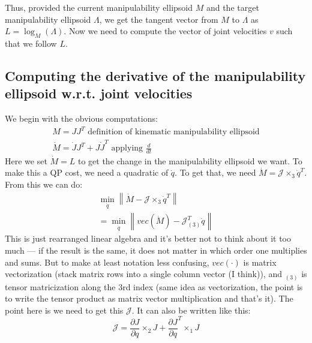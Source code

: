 \documentclass{article}
\begin{document}
Thus, provided the current manipulability ellipsoid $ M  $ and the target 
manipulability ellipsoid $ \Lambda  $, we get the tangent 
vector from $ M  $ to $ \Lambda  $
as $ L = \log_{ M } (\Lambda)  $.
Now we need to compute the vector of joint velocities $ v  $ such that
we follow $ L  $.

\subsection{Computing the derivative of the manipulability ellipsoid w.r.t. joint velocities}
We begin with the obvious computations:
\begin{gather}
		M = J J^{ T } \text{ definition of kinematic manipulability ellipsoid}\\
		\dot{M} = \dot{J} J^{ T } + J \dot{J}^{ T } \text{ applying } \frac{d }{d t}
\end{gather}
Here we set $ \dot{M} = L  $ to get the change in the manipulability ellipsoid we want.
To make this a QP cost, we need a quadratic of $ \dot{q}  $.
To get that, we need
$ \dot{M} = \mathcal{J} \times _{ 3 } \dot{q}^{ T }  $.
From this we can do:
\begin{gather}
		\min_{\dot{q}} \left\lVert 
\dot{M} - \mathcal{J} \times _{ 3 } \dot{q}^{ T }
		\right \rVert  \\
		=\min_{\dot{q}} \left\lVert 
vec(\dot{M}) - \mathcal{J}^{ T } _{ (3 )} \dot{q}
		\right \rVert  
\end{gather}
This is just rearranged linear algebra and it's better not to think about it too much
--- if the result is the same, it does not matter in which order one multiplies and sums.
But to make at least notation less confusing, $ vec (\cdot)  $ is matrix vectorization
(stack matrix rows into a single column vector (I think)),
and $ _{ (3) }  $ is tensor matricization along the 3rd index (same idea as vectorization,
the point is to write the tensor product as matrix vector multiplication and that's it).
The point here is we need to get this $ \mathcal{J}  $.
It can also be written like this:
\begin{equation}
\mathcal{J} = \frac{\partial J}{\partial q} \times _{ 2 } J +
\frac{\partial J}{\partial q} ^{ T } \times_{ 1 } J
\end{equation}
\end{document}
